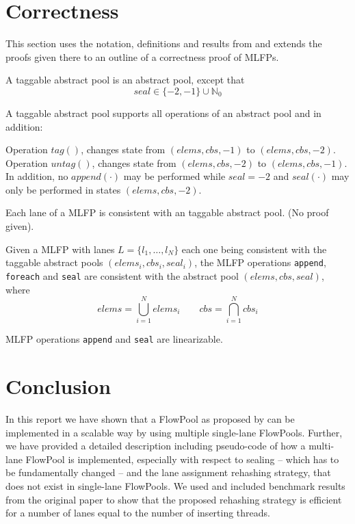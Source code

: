 \documentclass[runningheads,a4paper,fleqn]{llncs}
\begin{document}
\section{Correctness}
This section uses the notation, definitions and results from
\cite{FP12} and extends the proofs given there to an outline of a
correctness proof of MLFPs.

\begin{definition}
  A taggable abstract pool is an abstract pool, except that
  \[ seal \in \{ -2, -1 \} \cup \mathbb{N}_0 \]
\end{definition}

\begin{definition}
  A taggable abstract pool supports all operations of an abstract pool
  and in addition:

  Operation $tag()$, changes state from $(elems, cbs, -1)$ to $(elems,
  cbs, -2)$. Operation $untag()$, changes state from $(elems, cbs,
  -2)$ to $(elems, cbs, -1)$. In addition, no $append(\cdot)$ may be
  performed while $seal = -2$ and $seal(\cdot)$ may only be performed
  in states $(elems, cbs, -2)$.
\end{definition}

\begin{lemma}
  Each lane of a MLFP is consistent with an taggable abstract
  pool. (No proof given).
\end{lemma}

\begin{theorem}[Safety]
  Given a MLFP with lanes $L = \{l_1, \ldots, l_N\}$ each one being
  consistent with the taggable abstract pools $(elems_i, cbs_i,
  seal_i)$, the MLFP operations \verb+append+, \verb+foreach+ and
  \verb+seal+ are consistent with the abstract pool $(elems, cbs,
  seal)$, where 
  \[ elems = \bigcup_{i=1}^N elems_i \qquad
     cbs = \bigcap_{i=1}^N  cbs_i \]
\end{theorem}

\begin{theorem}[Linearizability]
  MLFP operations \verb+append+ and \verb+seal+ are linearizable.
\end{theorem}

\section{Conclusion}
In this report we have shown that a FlowPool as proposed by
\cite{FP12} can be implemented in a scalable way by using multiple
single-lane FlowPools. Further, we have provided a detailed
description including pseudo-code of how a multi-lane FlowPool is
implemented, especially with respect to sealing -- which has to be
fundamentally changed -- and the lane assignment rehashing strategy,
that does not exist in single-lane FlowPools. We used and included
benchmark results from the original paper to show that the proposed
rehashing strategy is efficient for a number of lanes equal to the
number of inserting threads.



\end{document}
